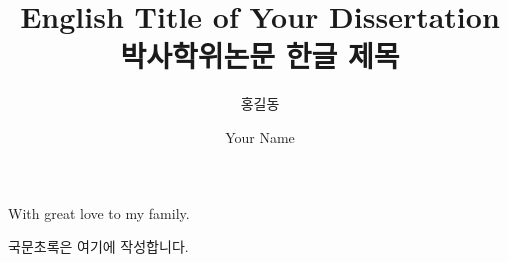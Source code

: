 \documentclass[twoside,phd]{snuthesis_utf8_suwon}
\title{\LARGE English Title of Your Dissertation}
\title*{\large 박사학위논문 한글 제목}
\author*{홍길동}
\author{Your Name}
\begin{document}
\makefrontcover
\makeapproval
\makeagreement
{} %
\begin{flushright}
	\vspace*{10\baselineskip}
	With great love to my family.
\end{flushright}

\setcounter{page}{1}
\begin{abstract}
    \lipsum[1-3]
\end{abstract}

\tableofcontents

\listoftables

\listoffigures



\begin{bibpage}
	
    
\end{bibpage}

\begin{appendices}
    
\end{appendices}

\begin{abstractalt}
    국문초록은 여기에 작성합니다.
\end{abstractalt}
\end{document}
